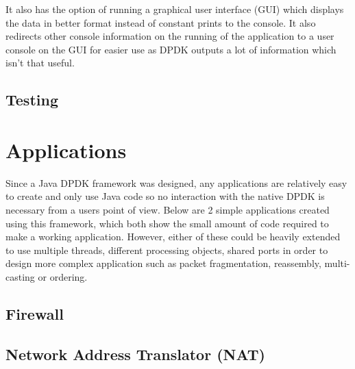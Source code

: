 \documentclass[final_report.tex]{subfiles}
\begin{document}
It also has the option of running a graphical user interface (GUI) which displays the data in better format instead of constant prints to the console. It also redirects other console information on the running of the application to a user console on the GUI for easier use as DPDK outputs a lot of information which isn't that useful.


\subsection{Testing}

\section{Applications}
Since a Java DPDK framework was designed, any applications are relatively easy to create and only use Java code so no interaction with the native DPDK is necessary from a users point of view. Below are 2 simple applications created using this framework, which both show the small amount of code required to make a working application. However, either of these could be heavily extended to use multiple threads, different processing objects, shared ports in order to design more complex application such as packet fragmentation, reassembly, multi-casting or ordering.

\subsection{Firewall}

\subsection{Network Address Translator (NAT)}
\end{document}
